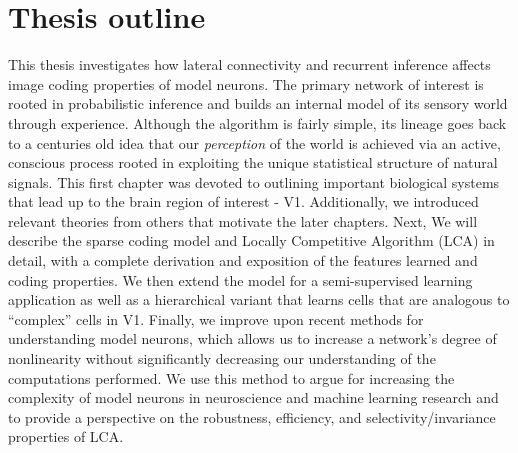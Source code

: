 \section{Thesis outline}\label{sec:ch1_outline}
This thesis investigates how lateral connectivity and recurrent inference affects image coding properties of model neurons. The primary network of interest is rooted in probabilistic inference and builds an internal model of its sensory world through experience. Although the algorithm is fairly simple, its lineage goes back to a centuries old idea that our \textit{perception} of the world is achieved via an active, conscious process rooted in exploiting the unique statistical structure of natural signals. This first chapter was devoted to outlining important biological systems that lead up to the brain region of interest - V1. Additionally, we introduced relevant theories from others that motivate the later chapters. Next, We will describe the sparse coding model and Locally Competitive Algorithm (LCA) in detail, with a complete derivation and exposition of the features learned and coding properties. We then extend the model for a semi-supervised learning application as well as a hierarchical variant that learns cells that are analogous to ``complex'' cells in V1. Finally, we improve upon recent methods for understanding model neurons, which allows us to increase a network's degree of nonlinearity without significantly decreasing our understanding of the computations performed. We use this method to argue for increasing the complexity of model neurons in neuroscience and machine learning research and to provide a perspective on the robustness, efficiency, and selectivity/invariance properties of LCA.